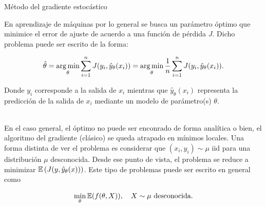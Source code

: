 \documentclass[handout, 9pt]{beamer}
\begin{document}
\begin{frame}{Método del gradiente estocástico}


En aprendizaje de máquinas por lo general se busca un parámetro óptimo que minimice el error de ajuste de acuerdo a una función de pérdida $J$. Dicho problema puede ser escrito de la forma: \pause
  
  \begin{equation*}
    \hat{\theta} = \operatorname*{arg\,min}_\theta \sum_{i=1}^n J(y_i,\hat{y}_\theta(x_i)) = \operatorname*{arg\,min}_\theta \frac{1}{n} \sum_{i=1}^n J(y_i,\hat{y}_\theta(x_i)).
  \end{equation*} \pause 
  
  Donde $y_i$ corresponde a la salida de $x_i$ mientras que $\hat{y}_\theta(x_i)$ representa la predicción de la salida de $x_i$ mediante un modelo de parámetro(s) $\theta$.\\~\
  
En el caso general, el óptimo no puede ser enconrado de forma analítica o bien, el algoritmo del gradiente (clásico) se queda atrapado en mínimos locales. Una forma distinta de ver el problema es considerar que $(x_i,y_i)\sim\mu$ iid para una distribución $\mu$ desconocida. Desde ese punto de vista, el problema se reduce a minimizar $\operatorname{\mathbb{E}}\left(J(y,\hat{y}_\theta(x))\right)$. Este tipo de problemas puede ser escrito en general como \pause 
  
  \begin{equation*}
    \min_\theta \operatorname{\mathbb{E}}(f(\theta,X)),\quad X\sim \mu\text{ desconocida}.
  \end{equation*} 




\end{frame}
\end{document}

